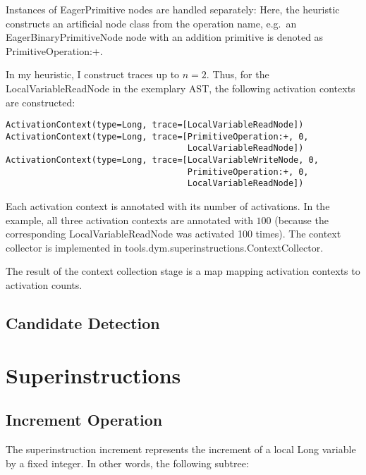 \documentclass[10pt,a4paper]{article}
\newcommand{\sinst}[1]{\textsf{#1}}
\begin{document}
Instances of \textsf{EagerPrimitive} nodes are handled separately: Here, the heuristic constructs an artificial node class from the operation name, e.g.\ an \textsf{EagerBinaryPrimitiveNode} node with an addition primitive is denoted as \textsf{PrimitiveOperation:+}.

In my heuristic, I construct traces up to $n=2$. Thus, for the \textsf{LocalVariableReadNode} in the exemplary AST, the following activation contexts are constructed:

\begin{verbatim}
ActivationContext(type=Long, trace=[LocalVariableReadNode])
ActivationContext(type=Long, trace=[PrimitiveOperation:+, 0,
                                    LocalVariableReadNode])
ActivationContext(type=Long, trace=[LocalVariableWriteNode, 0,
                                    PrimitiveOperation:+, 0,
                                    LocalVariableReadNode])
\end{verbatim}

Each activation context is annotated with its number of activations. In the example, all three activation contexts are annotated with $100$ (because the corresponding \textsf{LocalVariableReadNode} was activated 100 times). The context collector is implemented in \textsf{tools.dym.superinstructions.ContextCollector}.

The result of the context collection stage is a map mapping activation contexts to activation counts.

\subsection{Candidate Detection}



\section{Superinstructions}

\subsection{Increment Operation}

The superinstruction \sinst{increment} represents the increment of a local \textsf{Long} variable by a fixed integer.
In other words, the following subtree:
\end{document}
